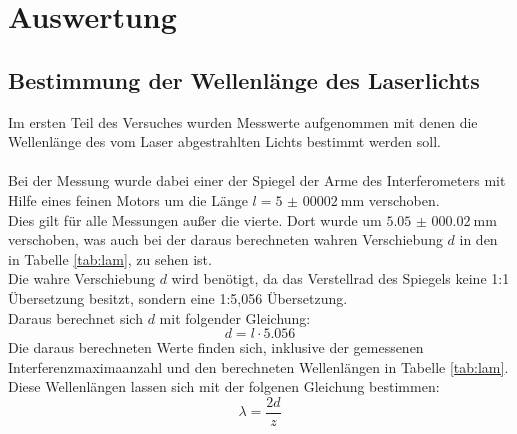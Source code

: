 \newpage
\section{Auswertung}

\subsection{Bestimmung der Wellenlänge des Laserlichts}

\noindent Im ersten Teil des Versuches wurden Messwerte aufgenommen mit denen die Wellenlänge des vom Laser abgestrahlten Lichts bestimmt werden soll.\\\\
Bei der Messung wurde dabei einer der Spiegel der Arme des Interferometers mit Hilfe eines feinen Motors um die Länge $l=\SI{5(00002)}{\milli\metre}$ verschoben.\\
Dies gilt für alle Messungen außer die vierte. Dort wurde um $\SI{5.05(00002)}{\milli\metre}$ verschoben, was auch bei der daraus berechneten wahren Verschiebung $d$ in den in Tabelle \ref{tab:lam}, zu sehen ist.\\
Die wahre Verschiebung $d$ wird benötigt, da das Verstellrad des Spiegels keine 1:1 Übersetzung besitzt, sondern eine 1:5,056 Übersetzung.\\
Daraus berechnet sich $d$ mit folgender Gleichung:
\begin{equation*}
    d=l \cdot 5.056
\end{equation*}
\noindent
Die daraus berechneten Werte finden sich, inklusive der gemessenen Interferenzmaximaanzahl und den berechneten Wellenlängen in Tabelle \ref{tab:lam}.\\
Diese Wellenlängen lassen sich mit der folgenen Gleichung bestimmen:
\begin{equation*}
    \lambda=\frac{2d}{z}
\end{equation*}


